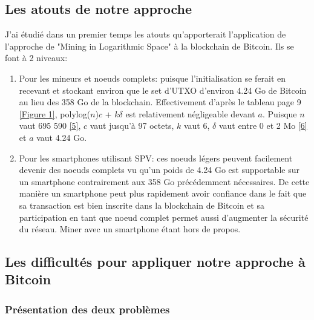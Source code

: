 \documentclass[12pt,a4paper]{article}
\newcommand{\source}[1]{\hyperlink{#1}{[#1]}}
\newcommand{\annexe}[2]{\hyperlink{#1}{[Figure #2]}}
\begin{document}
	\subsection{Les atouts de notre approche}
	
	J'ai étudié dans un premier temps les atouts qu'apporterait l'application de l'approche de "Mining in Logarithmic Space" à la blockchain de Bitcoin. Ils se font à 2 niveaux:\\
	\begin{enumerate}
	\item Pour les mineurs et noeuds complets: puisque l'initialisation se ferait en recevant et stockant environ que le set d'UTXO d'environ 4.24 Go de Bitcoin au lieu des 358 Go de la blockchain. Effectivement d'après le tableau page 9 \annexe{21}{1}, polylog($n$)$c$ + $k\delta$ est relativement négligeable devant $a$. Puisque $n$ vaut 695 590 \source{5}, $c$ vaut jusqu'à 97 octets, $k$ vaut 6, $\delta$ vaut entre 0 et 2 Mo \source{6} et $a$ vaut 4.24 Go. %
	
	\item Pour les smartphones utilisant SPV: ces noeuds légers peuvent facilement devenir des noeuds complets vu qu'un poids de 4.24 Go est supportable sur un smartphone contrairement aux 358 Go précédemment nécessaires. De cette manière un smartphone peut plus rapidement avoir confiance dans le fait que sa transaction est bien inscrite dans la blockchain de Bitcoin et sa participation en tant que noeud complet permet aussi d'augmenter la sécurité du réseau. %
	Miner avec un smartphone étant hors de propos.
	\end{enumerate}
	
	\subsection{Les difficultés pour appliquer notre approche à Bitcoin}
	
	\subsubsection{Présentation des deux problèmes}
	
\end{document}
